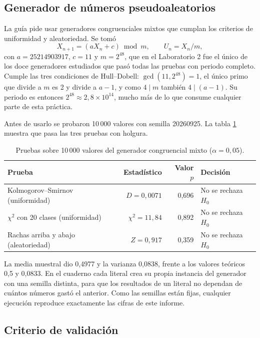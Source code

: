 \documentclass[11pt,letterpaper]{article}
\begin{document}
\subsection{Generador de números pseudoaleatorios}

La guía pide usar generadores congruenciales mixtos que cumplan los criterios de uniformidad y
aleatoriedad. Se tomó
\[
X_{n+1} = (a X_n + c) \bmod m, \qquad U_n = X_n/m,
\]
con $a = 25214903917$, $c = 11$ y $m = 2^{48}$, que en el Laboratorio 2 fue el único de los doce
generadores estudiados que pasó todas las pruebas con periodo completo. Cumple las tres condiciones de
Hull--Dobell: $\gcd(11, 2^{48}) = 1$, el único primo que divide a $m$ es 2 y divide a $a - 1$, y como
$4 \mid m$ también $4 \mid (a-1)$. Su periodo es entonces $2^{48} \approx 2{,}8\times10^{14}$, mucho
más de lo que consume cualquier parte de esta práctica.

Antes de usarlo se probaron 10\,000 valores con semilla 20260925. La tabla \ref{tab:gcm} muestra que
pasa las tres pruebas con holgura.

\begin{table}[H]
\centering
\caption{Pruebas sobre 10\,000 valores del generador congruencial mixto ($\alpha = 0{,}05$).}
\label{tab:gcm}
\small
\begin{tabular}{@{}lrrl@{}}
\toprule
Prueba & Estadístico & Valor $p$ & Decisión \\
\midrule
Kolmogorov--Smirnov (uniformidad)      & $D = 0{,}0071$      & 0,696 & No se rechaza $H_0$ \\
$\chi^2$ con 20 clases (uniformidad)   & $\chi^2 = 11{,}84$  & 0,892 & No se rechaza $H_0$ \\
Rachas arriba y abajo (aleatoriedad)   & $Z = 0{,}917$       & 0,359 & No se rechaza $H_0$ \\
\bottomrule
\end{tabular}
\end{table}

La media muestral dio 0,4977 y la varianza 0,0838, frente a los valores teóricos 0,5 y 0,0833. En el
cuaderno cada literal crea su propia instancia del generador con una semilla distinta, para que los
resultados de un literal no dependan de cuántos números gastó el anterior. Como las semillas están
fijas, cualquier ejecución reproduce exactamente las cifras de este informe.

\subsection{Criterio de validación}
\end{document}
